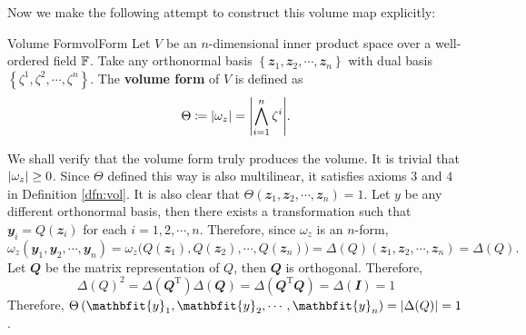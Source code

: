 \documentclass[math, code]{amznotes}
\theoremstyle{remark}
\newcommand{\I}{\mathbfit{I}}
\begin{document}
Now we make the following attempt to construct this volume map explicitly:
\begin{dfnbox}{Volume Form}{volForm}
    Let $V$ be an $n$-dimensional inner product space over a well-ordered field $\mathbb{F}$. Take any orthonormal basis $\left\{\mathbfit{z}_1, \mathbfit{z}_2, \cdots, \mathbfit{z}_n\right\}$ with dual basis $\left\{\zeta^1, \zeta^2, \cdots, \zeta^n\right\}$. The {\color{red} \textbf{volume form}} of $V$ is defined as 
    \begin{equation*}
        \Theta \coloneqq {\left\lvert {\omega_z} \right\rvert} = {\left\lvert {\bigwedge_{i = 1}^n\zeta^i} \right\rvert}.
    \end{equation*}
\end{dfnbox}
We shall verify that the volume form truly produces the volume. It is trivial that ${\left\lvert {\omega_z} \right\rvert} \geq 0$. Since $\Theta$ defined this way is also multilinear, it satisfies axioms $3$ and $4$ in Definition \ref{dfn:vol}. It is also clear that $\Theta\left(\mathbfit{z}_1, \mathbfit{z}_2, \cdots, \mathbfit{z}_n\right) = 1$. Let $y$ be any different orthonormal basis, then there exists a transformation such that $\mathbfit{y}_i = Q\left(\mathbfit{z}_i\right)$ for each $i = 1, 2, \cdots, n$. Therefore, since $\omega_z$ is an $n$-form,
\begin{equation*}
    \omega_z\left(\mathbfit{y}_1, \mathbfit{y}_2, \cdots, \mathbfit{y}_n\right) = \omega_z\bigl(Q\left(\mathbfit{z}_1\right), Q\left(\mathbfit{z}_2\right), \cdots, Q\left(\mathbfit{z}_n\right)\bigr) = \Delta(Q)\left(\mathbfit{z}_1, \mathbfit{z}_2, \cdots, \mathbfit{z}_n\right) = \Delta(Q).
\end{equation*}
Let $\mathbfit{Q}$ be the matrix representation of $Q$, then $\mathbfit{Q}$ is orthogonal. Therefore, 
\begin{equation*}
    \Delta(Q)^2 = \Delta\left(\mathbfit{Q}^{\mathrm{T}}\right)\Delta\left(\mathbfit{Q}\right) = \Delta\left(\mathbfit{Q}^{\mathrm{T}}\mathbfit{Q}\right) = \Delta\left(\I\right) = 1
\end{equation*}
Therefore, $\Theta\left(\mathbfit{y}_1, \mathbfit{y}_2, \cdots, \mathbfit{y}_n\right) = \abs{\Delta(Q)} = 1$.
\end{document}
